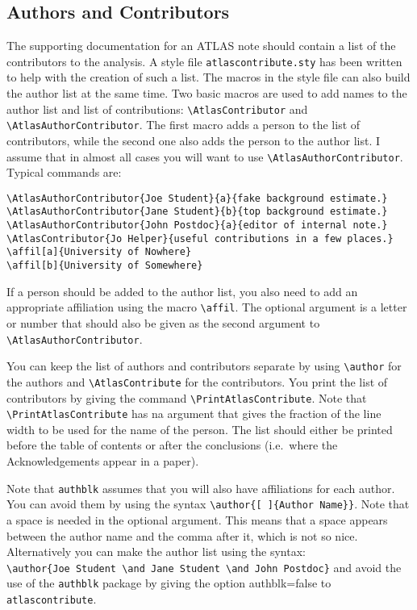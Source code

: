 \documentclass[atlasstyle,UKenglish]{latex/atlasdoc}
\newcommand{\Macro}[1]{\texttt{\textbackslash #1}\xspace}
\newcommand{\Option}[1]{\textsf{#1}\xspace}
\newcommand{\Package}[1]{\texttt{#1}\xspace}
\begin{document}
\subsection{Authors and Contributors}
\label{sec:contribute}

The supporting documentation for an ATLAS note should contain a list of the contributors to the analysis.
A style file \Package{atlascontribute.sty} has been written to help with the creation of such a list.
The macros in the style file can also build the author list at the same time.
Two basic macros are used to add names to the author list and list of contributions:
\Macro{AtlasContributor} and \Macro{AtlasAuthorContributor}. 
The first macro adds a person to the list of contributors, while the second one also adds the person
to the author list. I assume that in almost all cases you will want to use \Macro{AtlasAuthorContributor}.
Typical commands are:
\begin{verbatim}
\AtlasAuthorContributor{Joe Student}{a}{fake background estimate.}
\AtlasAuthorContributor{Jane Student}{b}{top background estimate.}
\AtlasAuthorContributor{John Postdoc}{a}{editor of internal note.}
\AtlasContributor{Jo Helper}{useful contributions in a few places.}
\affil[a]{University of Nowhere}
\affil[b]{University of Somewhere}
\end{verbatim}
If a person should be added to the author list, you also need to add an appropriate affiliation using the macro \Macro{affil}.
The optional argument is a letter or number that should also be given as the second argument to
\Macro{AtlasAuthorContributor}.

You can keep the list of authors and contributors separate
by using \Macro{author} for the authors and \Macro{AtlasContribute} for the contributors.
You print the list of contributors by giving the command \Macro{PrintAtlasContribute}.
Note that \Macro{PrintAtlasContribute} has na argument that gives the fraction of the line width
to be used for the name of the person.
The list should either be printed before the table of contents or after the conclusions
(i.e.\ where the Acknowledgements appear in a paper).

Note that \Package{authblk} assumes that you will also have affiliations for each author.
You can avoid them by using the syntax \verb|\author{[ ]{Author Name}}|.
Note that a space is needed in the optional argument.
This means that a space appears between the author name and the comma after it, which is not so nice.
Alternatively you can make the author list using the syntax:\\
\verb|\author{Joe Student \and Jane Student \and John Postdoc}| and avoid the use of the
\Package{authblk} package by giving the option \Option{authblk=false} to \Package{atlascontribute}.
\end{document}
